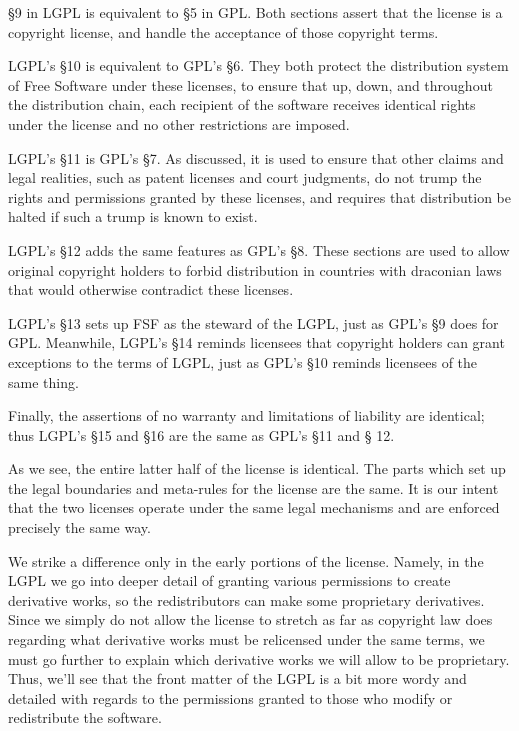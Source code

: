 \S 9 in LGPL is equivalent to \S 5 in GPL\@. Both sections assert that
the license is a copyright license, and handle the acceptance of those
copyright terms.

LGPL's \S 10 is equivalent to GPL's \S 6. They both protect the
distribution system of Free Software under these licenses, to ensure that
up, down, and throughout the distribution chain, each recipient of the
software receives identical rights under the license and no other
restrictions are imposed.

LGPL's \S 11 is GPL's \S 7. As discussed, it is used to ensure that
other claims and legal realities, such as patent licenses and court
judgments, do not trump the rights and permissions granted by these
licenses, and requires that distribution be halted if such a trump is
known to exist.

LGPL's \S 12 adds the same features as GPL's \S 8. These sections are
used to allow original copyright holders to forbid distribution in
countries with draconian laws that would otherwise contradict these
licenses.

LGPL's \S 13 sets up FSF as the steward of the LGPL, just as GPL's \S 9
does for GPL. Meanwhile, LGPL's \S 14 reminds licensees that copyright
holders can grant exceptions to the terms of LGPL, just as GPL's \S 10
reminds licensees of the same thing.

Finally, the assertions of no warranty and limitations of liability are
identical; thus LGPL's \S 15 and \S 16 are the same as GPL's \S 11 and \S
12.

As we see, the entire latter half of the license is identical.
The parts which set up the legal boundaries and meta-rules for the license
are the same. It is our intent that the two licenses operate under the
same legal mechanisms and are enforced precisely the same way.

We strike a difference only in the early portions of the license.
Namely, in the LGPL we go into deeper detail of granting various permissions to
create derivative works, so the redistributors can make
some proprietary derivatives. Since we simply do not allow the
license to stretch as far as copyright law does regarding what
derivative works must be relicensed under the same terms, we must go
further to explain which derivative works we will allow to be
proprietary. Thus, we'll see that the front matter of the LGPL is a
bit more wordy and detailed with regards to the permissions granted to
those who modify or redistribute the software.

